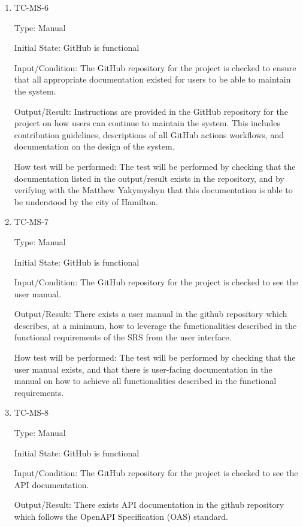 \documentclass[12pt, titlepage]{article}
\begin{document}
\begin{enumerate}
  \item{TC-MS-6\\}

    Type: Manual

    Initial State: GitHub is functional

    Input/Condition: The GitHub repository for the project is checked
    to ensure that all appropriate documentation existed for users to
    be able to maintain the system.

    Output/Result: Instructions are provided in the GitHub repository
    for the project on how users can continue to maintain the system.
    This includes contribution guidelines, descriptions of all
    GitHub actions workflows, and documentation on the design of the system.

    How test will be performed: The test will be performed by
    checking that the documentation listed in the output/result
    exists in the repository, and by verifying with the Matthew
    Yakymyshyn that this documentation is able to be understood by
    the city of Hamilton.

  \item{TC-MS-7\\}

    Type: Manual

    Initial State: GitHub is functional

    Input/Condition: The GitHub repository for the project is checked
    to see the user manual.

    Output/Result: There exists a user manual in the github
    repository which describes, at a minimum, how to leverage the
    functionalities described in the functional requirements of the
    SRS from the user interface.

    How test will be performed: The test will be performed by
    checking that the user manual exists, and that there is
    user-facing documentation in the manual on how to achieve all
    functionalities described in the functional requirements.

  \item{TC-MS-8\\}

    Type: Manual

    Initial State: GitHub is functional

    Input/Condition: The GitHub repository for the project is checked
    to see the API documentation.

    Output/Result: There exists API documentation in the github
    repository which follows the OpenAPI Specification (OAS) standard.


\end{enumerate}
\end{document}
